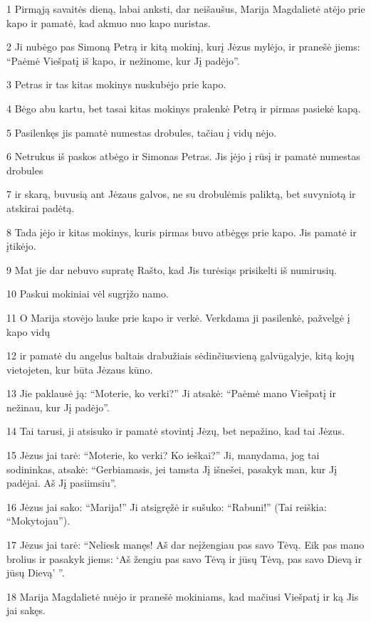 \par 1 Pirmąją savaitės dieną, labai anksti, dar neišaušus, Marija Magdalietė atėjo prie kapo ir pamatė, kad akmuo nuo kapo nuristas. 
\par 2 Ji nubėgo pas Simoną Petrą ir kitą mokinį, kurį Jėzus mylėjo, ir pranešė jiems: “Paėmė Viešpatį iš kapo, ir nežinome, kur Jį padėjo”. 
\par 3 Petras ir tas kitas mokinys nuskubėjo prie kapo. 
\par 4 Bėgo abu kartu, bet tasai kitas mokinys pralenkė Petrą ir pirmas pasiekė kapą. 
\par 5 Pasilenkęs jis pamatė numestas drobules, tačiau į vidų nėjo. 
\par 6 Netrukus iš paskos atbėgo ir Simonas Petras. Jis įėjo į rūsį ir pamatė numestas drobules 
\par 7 ir skarą, buvusią ant Jėzaus galvos, ne su drobulėmis paliktą, bet suvyniotą ir atskirai padėtą. 
\par 8 Tada įėjo ir kitas mokinys, kuris pirmas buvo atbėgęs prie kapo. Jis pamatė ir įtikėjo. 
\par 9 Mat jie dar nebuvo supratę Rašto, kad Jis turėsiąs prisikelti iš numirusių. 
\par 10 Paskui mokiniai vėl sugrįžo namo. 
\par 11 O Marija stovėjo lauke prie kapo ir verkė. Verkdama ji pasilenkė, pažvelgė į kapo vidų 
\par 12 ir pamatė du angelus baltais drabužiais sėdinčius­vieną galvūgalyje, kitą kojų vietoje­ten, kur būta Jėzaus kūno. 
\par 13 Jie paklausė ją: “Moterie, ko verki?” Ji atsakė: “Paėmė mano Viešpatį ir nežinau, kur Jį padėjo”. 
\par 14 Tai tarusi, ji atsisuko ir pamatė stovintį Jėzų, bet nepažino, kad tai Jėzus. 
\par 15 Jėzus jai tarė: “Moterie, ko verki? Ko ieškai?” Ji, manydama, jog tai sodininkas, atsakė: “Gerbiamasis, jei tamsta Jį išnešei, pasakyk man, kur Jį padėjai. Aš Jį pasiimsiu”. 
\par 16 Jėzus jai sako: “Marija!” Ji atsigręžė ir sušuko: “Rabuni!” (Tai reiškia: “Mokytojau”). 
\par 17 Jėzus jai tarė: “Neliesk manęs! Aš dar neįžengiau pas savo Tėvą. Eik pas mano brolius ir pasakyk jiems: ‘Aš žengiu pas savo Tėvą ir jūsų Tėvą, pas savo Dievą ir jūsų Dievą’ ”. 
\par 18 Marija Magdalietė nuėjo ir pranešė mokiniams, kad mačiusi Viešpatį ir ką Jis jai sakęs. 
